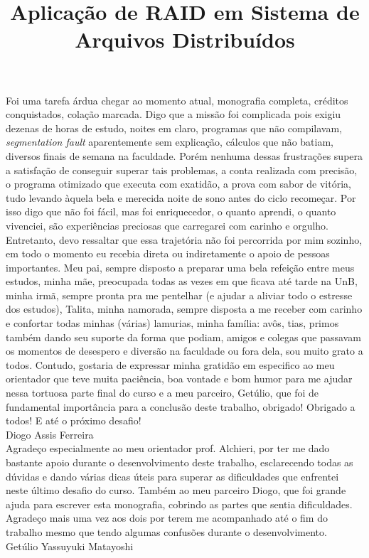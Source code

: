 \documentclass[bacharelado]{unb-cic}
\title{Aplicação de RAID em Sistema de Arquivos Distribuídos}
\begin{document}
\maketitle

\pretextual

\begin{agradecimentos}
Foi uma tarefa árdua chegar ao momento atual, monografia completa, créditos conquistados, colação marcada. Digo que a missão foi complicada pois exigiu dezenas de horas de estudo, noites em claro, programas que não compilavam, \textit{segmentation fault} aparentemente sem explicação, cálculos que não batiam, diversos finais de semana na faculdade. Porém nenhuma dessas frustrações supera a satisfação de conseguir superar tais problemas, a conta realizada com precisão, o programa otimizado que executa com exatidão, a prova com sabor de vitória, tudo levando àquela bela e merecida noite de sono antes do ciclo recomeçar. Por isso digo que não foi fácil, mas foi enriquecedor, o quanto aprendi, o quanto vivenciei, são experiências preciosas que carregarei com carinho e orgulho. Entretanto, devo ressaltar que essa trajetória não foi percorrida por mim sozinho, em todo o momento eu recebia direta ou indiretamente o apoio de pessoas importantes. Meu pai, sempre disposto a preparar uma bela refeição entre meus estudos, minha mãe, preocupada todas as vezes em que ficava até tarde na UnB, minha irmã, sempre pronta pra me pentelhar (e ajudar a aliviar todo o estresse dos estudos), Talita, minha namorada, sempre disposta a me receber com carinho e confortar todas minhas (várias) lamurias, minha família: avôs, tias, primos também dando seu suporte da forma que podiam, amigos e colegas que passavam os momentos de desespero e diversão na faculdade ou fora dela, sou muito grato a todos. Contudo, gostaria de expressar minha gratidão em especifico ao meu orientador que teve muita paciência, boa vontade e bom humor para me ajudar nessa tortuosa parte final do curso e a meu parceiro, Getúlio, que foi de fundamental importância para a conclusão deste trabalho, obrigado! Obrigado a todos! E até o próximo desafio!
\\

Diogo Assis Ferreira
\\

Agradeço especialmente ao meu orientador prof. Alchieri, por ter me dado bastante apoio durante o desenvolvimento deste trabalho, esclarecendo todas as dúvidas e dando várias dicas úteis para superar as dificuldades que enfrentei neste último desafio do curso. Também ao meu parceiro Diogo, que foi grande ajuda para escrever esta monografia, cobrindo as partes que sentia dificuldades.
Agradeço mais uma vez aos dois por terem me acompanhado até o fim do trabalho mesmo que tendo algumas confusões durante o desenvolvimento.
\\

Getúlio Yassuyuki Matayoshi
\\

\end{agradecimentos}
\end{document}
